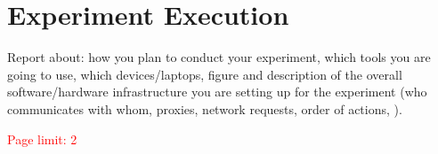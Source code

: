 \section{Experiment Execution}
Report about: how you plan to conduct your experiment, which tools you are going to use, which devices/laptops, figure and description of the overall software/hardware infrastructure you are setting up for the experiment (\eg who communicates with whom, proxies, network requests, order of actions, \etc). 

\textcolor{red}{Page limit: 2}
